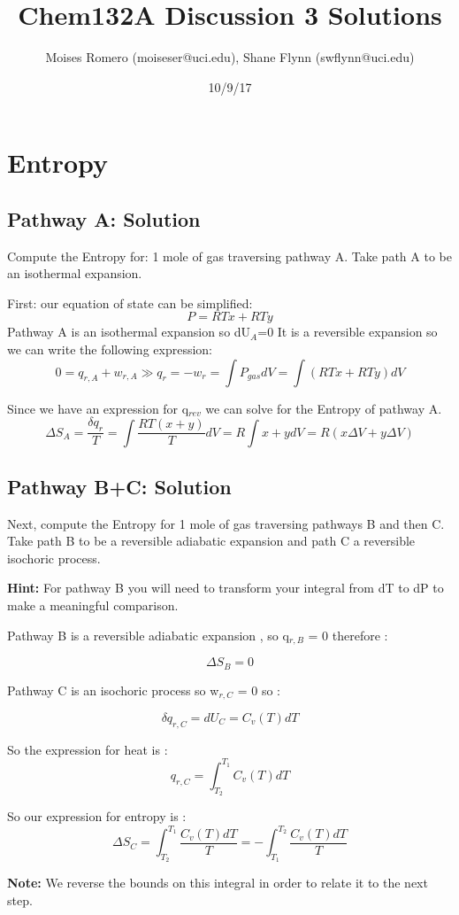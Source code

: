 \documentclass{article}
\title{Chem132A Discussion 3 Solutions}
\author{Moises Romero (moiseser@uci.edu), Shane Flynn (swflynn@uci.edu) }
\date{10/9/17}
\newcommand{\be}{\begin{equation}}
\newcommand{\ee}{\end{equation}}
\begin{document}
\maketitle

\section{Entropy}

\subsection{Pathway A: Solution}
Compute the Entropy for: 1 mole of gas traversing pathway A.
Take path A to be an isothermal expansion. 

First: our equation of state can be simplified: 
\be
P = RTx + RTy
\ee
Pathway A is an isothermal expansion so dU$_{A}$=0 
It is a reversible expansion so we can write the following expression:   
\be 
0 = q_{r,A} + w_{r,A} \gg  q_{r}=-w_{r} = \int P_{gas}dV = \int ({RTx}+{RTy}) dV
\ee

Since we have an expression for q$_{rev}$ we can solve for the Entropy of pathway A. 
\be
\Delta S_{A} = \frac{\delta q_{r}}{T}= \int \frac{RT(x+y)}{T} dV = R \int x+y dV = R (x\Delta V + y\Delta V )
\ee

\subsection{Pathway B+C: Solution}
Next, compute the Entropy for 1 mole of gas traversing pathways B and then C.  
Take path B to be a reversible adiabatic expansion and path C a reversible isochoric process. 

\textbf{Hint:}
For pathway B you will need to transform your integral from dT to dP to make a meaningful comparison. 

Pathway B is a reversible adiabatic expansion , so q$_{r,B}$ = 0 therefore : 

\be
\Delta S_{B} = 0
\ee

Pathway C is an isochoric process so w$_{r,C}$ = 0 so : 

\be 
\delta q_{r,C} = dU_C = C_v(T)dT 
\ee

So the expression for heat is : 
\be
q_{r,C} = \int_{T_2}^{T_1} C_v(T)dT
\ee

So our expression for entropy is : 
\be
\Delta S_C = \int_{T_2}^{T_1}\frac{ C_v(T)dT}{T} = -\int_{T_1}^{T_2} \frac{ C_v(T)dT}{T}
\ee

\textbf{Note:} We reverse the bounds on this integral in order to relate it to the next step. 
\end{document}
